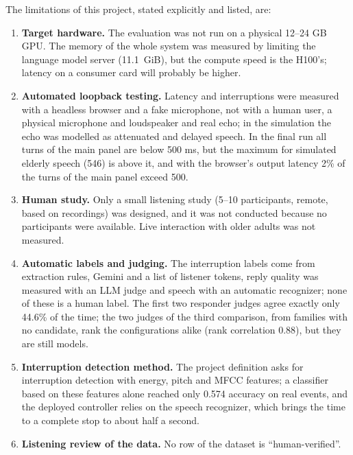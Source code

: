The limitations of this project, stated explicitly and listed, are:

\begin{enumerate}
\item \textbf{Target hardware.} The evaluation was not run on a physical 12--24 GB GPU. The memory
      of the whole system was measured by limiting the language model server (11.1~GiB), but the
      compute speed is the H100's; latency on a consumer card will probably be higher.

\item \textbf{Automated loopback testing.} Latency and interruptions were measured with a headless
      browser and a fake microphone, not with a human user, a physical microphone and loudspeaker
      and real echo; in the simulation the echo was modelled as attenuated and delayed speech. In
      the final run all turns of the main panel are below 500 ms, but the maximum for simulated
      elderly speech (546) is above it, and with the browser's output latency 2\% of the turns of
      the main panel exceed 500.

\item \textbf{Human study.} Only a small listening study (5--10 participants, remote, based on
      recordings) was designed, and it was not conducted because no participants were
      available. Live interaction with older adults was not measured.

\item \textbf{Automatic labels and judging.} The interruption labels come from extraction rules,
      Gemini and a list of listener tokens, reply quality was measured with an LLM judge and speech
      with an automatic recognizer; none of these is a human label. The first two responder judges
      agree exactly only 44.6\% of the time; the two judges of the third comparison, from families with
      no candidate, rank the configurations alike (rank correlation 0.88), but they are still models.

\item \textbf{Interruption detection method.} The project definition asks for interruption detection
      with energy, pitch and MFCC features; a classifier based on these features alone reached only
      0.574 accuracy on real events, and the deployed controller relies on the speech recognizer,
      which brings the time to a complete stop to about half a second.

\item \textbf{Listening review of the data.} No row of the dataset is ``human-verified''.


\end{enumerate}
